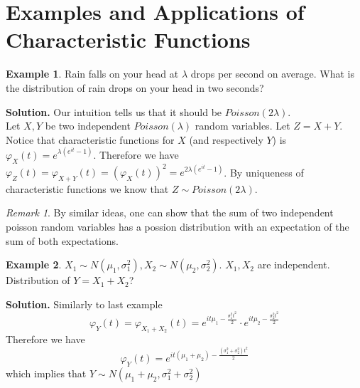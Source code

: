 \documentclass{article}
\theoremstyle{definition}
\newtheorem{example}{Example}[section]
\theoremstyle{plain}
\theoremstyle{remark}
\newtheorem*{remark}{Remark}
\begin{document}
\section{Examples and Applications of Characteristic Functions}
\begin{example}
	Rain falls on your head at $\lambda$ drops per second on average. What is the distribution of rain drops on your head in two seconds?
\end{example}
\noindent\textbf{Solution.}
Our intuition tells us that it should be $Poisson(2\lambda)$. \\
Let $X,Y$ be two independent $Poisson(\lambda)$ random variables. Let $Z=X+Y$.
Notice that characteristic functions for $X$ (and respectively $Y$) is $\varphi_X(t)=e^{\lambda(e^{it}-1)}$.
Therefore we have $\varphi_Z(t)=\varphi_{X+Y}(t)=(\varphi_X(t))^2=e^{2\lambda(e^{it}-1)}$. 
By uniqueness of characteristic functions we know that $Z\sim Poisson(2\lambda)$.
\begin{remark}
	By similar ideas, one can show that the sum of two independent poisson random variables has a possion distribution with an expectation of the sum of both expectations.
\end{remark}
\begin{example}
	$X_1\sim N(\mu_1,\sigma_1^2), X_2\sim N(\mu_2,\sigma_2^2).$ $X_1,X_2$ are independent. Distribution of $Y=X_1+X_2$?
\end{example}
\noindent\textbf{Solution.}
Similarly to last example $$\varphi_{Y}(t)=\varphi_{X_1+X_2}(t)=e^{it\mu_1-\frac{\sigma_1^2 t^2}{2}}\cdot e^{it\mu_2-\frac{\sigma_2^2 t^2}{2}}$$
Therefore we have $$\varphi_Y(t)=e^{it(\mu_1+\mu_2)-\frac{(\sigma_1^2+\sigma_2^2)t^2}{2}}$$
which implies that $Y\sim N(\mu_1+\mu_2,\sigma_1^2+\sigma_2^2)$
\medskip



\end{document}

